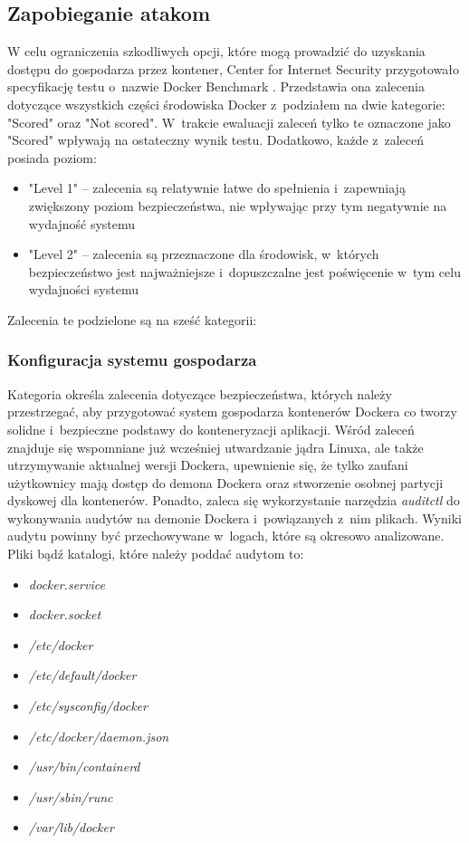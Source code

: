 \subsection{Zapobieganie atakom}

W celu ograniczenia szkodliwych opcji, które mogą prowadzić do uzyskania dostępu do gospodarza przez kontener, Center for Internet Security przygotowało specyfikację testu o~nazwie Docker Benchmark \cite{CISDockerBenchmark}. Przedstawia ona zalecenia dotyczące wszystkich części środowiska Docker z~podziałem na dwie kategorie: "Scored" oraz "Not scored". W~trakcie ewaluacji zaleceń tylko te oznaczone jako "Scored" wpływają na ostateczny wynik testu. Dodatkowo, każde z~zaleceń posiada poziom:

\begin{itemize}
    \item "Level 1" -- zalecenia są relatywnie łatwe do spełnienia i~zapewniają zwiększony poziom bezpieczeństwa, nie wpływając przy tym negatywnie na wydajność systemu
    \item "Level 2" -- zalecenia są przeznaczone dla środowisk, w~których bezpieczeństwo jest najważniejsze i~dopuszczalne jest poświęcenie w~tym celu wydajności systemu
\end{itemize}

Zalecenia te podzielone są na sześć kategorii:

\subsubsection{Konfiguracja systemu gospodarza}

Kategoria określa zalecenia dotyczące bezpieczeństwa, których należy przestrzegać, aby przygotować system gospodarza kontenerów Dockera co tworzy solidne i~bezpieczne podstawy do konteneryzacji aplikacji. Wśród zaleceń znajduje się wspomniane już wcześniej utwardzanie jądra Linuxa, ale także utrzymywanie aktualnej wersji Dockera, upewnienie się, że tylko zaufani użytkownicy mają dostęp do demona Dockera oraz stworzenie osobnej partycji dyskowej dla kontenerów. Ponadto, zaleca się wykorzystanie narzędzia \textit{auditctl} do wykonywania audytów na demonie Dockera i~powiązanych z~nim plikach. Wyniki audytu powinny być przechowywane w~logach, które są okresowo analizowane. Pliki bądź katalogi, które należy poddać audytom to:

\begin{itemize}
    \item \textit{docker.service}
    \item \textit{docker.socket}
    \item \textit{/etc/docker}
    \item \textit{/etc/default/docker}
    \item \textit{/etc/sysconfig/docker}
    \item \textit{/etc/docker/daemon.json}
    \item \textit{/usr/bin/containerd}
    \item \textit{/usr/sbin/runc}
    \item \textit{/var/lib/docker}
\end{itemize}

